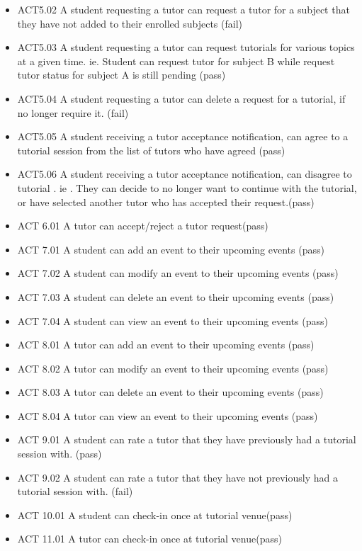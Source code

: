 \documentclass[12pt]{article}
\begin{document}
\begin{itemize}
\item ACT5.02	A student requesting a tutor can request a tutor for a subject that they have not added to their enrolled subjects  (fail)
\item ACT5.03	A student requesting a tutor can request tutorials for various topics at a given time. ie. Student can request tutor for subject B while request tutor status for subject A is still pending (pass)
\item ACT5.04	A student requesting a tutor can delete a request for a  tutorial, if no longer require it. (fail)
\item ACT5.05	A student receiving a tutor acceptance notification, can agree to a tutorial session from the list  of tutors who have agreed (pass)
\item ACT5.06 A student receiving a tutor acceptance notification, can disagree to tutorial . ie . They can decide to no longer want to continue with the tutorial, or have selected another tutor who has accepted their request.(pass)		%
\item ACT 6.01 A tutor can accept/reject a tutor request(pass)
\item ACT 7.01 A student can add an event to their upcoming events (pass)
\item ACT 7.02 A student can modify an event to their upcoming events (pass)
\item ACT 7.03 A student can delete an event to their upcoming events (pass)
\item ACT 7.04 A student can view an event to their upcoming events (pass)
\item ACT 8.01 A tutor can add an event to their upcoming events (pass)
\item ACT 8.02 A tutor can modify an event to their upcoming events (pass)
\item ACT 8.03 A tutor can delete an event to their upcoming events (pass)
\item ACT 8.04 A tutor can view an event to their upcoming events (pass)
\item ACT 9.01 A student can rate a tutor that they have previously had a tutorial session with. (pass)
\item ACT 9.02 A student can rate a tutor that they have not previously had a tutorial session with. (fail)
\item ACT 10.01 A student can check-in once at tutorial venue(pass)
\item ACT 11.01 A tutor can check-in once at tutorial venue(pass)

\end{itemize}
\end{document}
